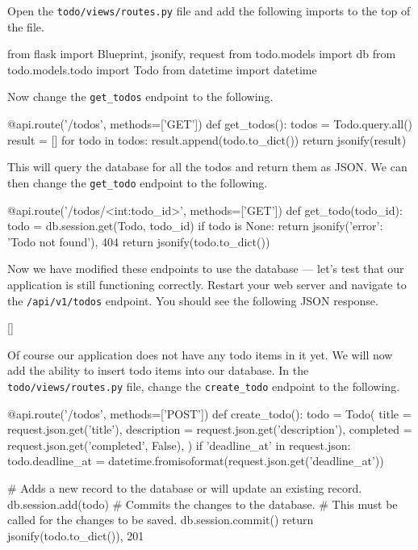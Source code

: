 \documentclass{csse4400}
\begin{document}
Open the \texttt{todo/views/routes.py} file and add the following imports to the top of the file.

\begin{code}[language=python,numbers=none]{}
from flask import Blueprint, jsonify, request
from todo.models import db
from todo.models.todo import Todo
from datetime import datetime
\end{code}

Now change the \texttt{get\_todos} endpoint to the following.

\begin{code}[language=python,numbers=none]{}
@api.route('/todos', methods=['GET'])
def get_todos():
    todos = Todo.query.all()
    result = []
    for todo in todos:
        result.append(todo.to_dict())
    return jsonify(result)
\end{code}

This will query the database for all the todos and return them as JSON.
We can then change the \texttt{get\_todo} endpoint to the following.

\begin{code}[language=python,numbers=none]{}
@api.route('/todos/<int:todo_id>', methods=['GET'])
def get_todo(todo_id):
    todo = db.session.get(Todo, todo_id)
    if todo is None:
        return jsonify({'error': 'Todo not found'}), 404
    return jsonify(todo.to_dict())
\end{code}

Now we have modified these endpoints to use the database --- let's test that our application is still functioning correctly.
Restart your web server and navigate to the \texttt{/api/v1/todos} endpoint.
You should see the following JSON response.

\begin{code}[language=json,numbers=none]{}
  []
\end{code}

Of course our application does not have any todo items in it yet.
We will now add the ability to insert todo items into our database.
In the \texttt{todo/views/routes.py} file, change the \texttt{create\_todo} endpoint to the following.

\begin{code}[language=python,numbers=none]{}
@api.route('/todos', methods=['POST'])
def create_todo():
    todo = Todo(
        title = request.json.get('title'),
        description = request.json.get('description'),
        completed = request.json.get('completed', False),
    )
    if 'deadline_at' in request.json:
        todo.deadline_at = datetime.fromisoformat(request.json.get('deadline_at'))

    # Adds a new record to the database or will update an existing record.
    db.session.add(todo)
    # Commits the changes to the database.
    # This must be called for the changes to be saved.
    db.session.commit()
    return jsonify(todo.to_dict()), 201
\end{code}
\end{document}

